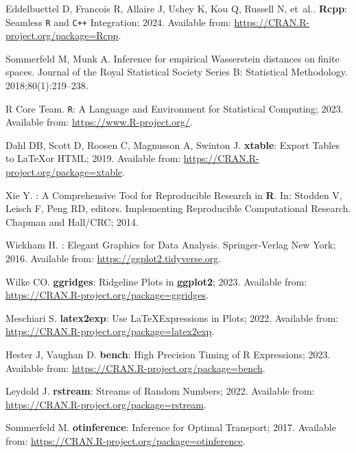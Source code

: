 \documentclass[10pt,letterpaper]{article}
\newcommand{\pkg}[1]{{\bf #1}}
\newcommand{\proglang}[1]{\texttt{#1}}
\begin{document}
\begin{thebibliography}{10}
Eddelbuettel D, Francois R, Allaire J, Ushey K, Kou Q, Russell N, et~al.. \pkg{Rcpp}: Seamless \proglang{R} and \proglang{C++} Integration; 2024.
\newblock Available from: \url{https://CRAN.R-project.org/package=Rcpp}.

Sommerfeld M, Munk A.
\newblock Inference for empirical Wasserstein distances on finite spaces.
\newblock Journal of the Royal Statistical Society Series B: Statistical Methodology. 2018;80(1):219--238.

{R Core Team}. \proglang{R}: {A} Language and Environment for Statistical Computing; 2023.
\newblock Available from: \url{https://www.R-project.org/}.

Dahl DB, Scott D, Roosen C, Magnusson A, Swinton J. \pkg{xtable}: {E}xport Tables to \LaTeX or HTML; 2019.
\newblock Available from: \url{https://CRAN.R-project.org/package=xtable}.

Xie Y.
\newblock \pkg{knitr}: {A} Comprehensive Tool for Reproducible Research in \pkg{R}.
\newblock In: Stodden V, Leisch F, Peng RD, editors. Implementing Reproducible Computational Research. Chapman and Hall/CRC; 2014.

Wickham H.
\newblock \pkg{ggplot2}: {E}legant Graphics for Data Analysis.
\newblock Springer-Verlag New York; 2016.
\newblock Available from: \url{https://ggplot2.tidyverse.org}.

Wilke CO. \pkg{ggridges}: {R}idgeline Plots in \pkg{ggplot2}; 2023.
\newblock Available from: \url{https://CRAN.R-project.org/package=ggridges}.

Meschiari S. \pkg{latex2exp}: {U}se \LaTeX Expressions in Plots; 2022.
\newblock Available from: \url{https://CRAN.R-project.org/package=latex2exp}.

Hester J, Vaughan D. \pkg{bench}: {H}igh Precision Timing of R Expressions; 2023.
\newblock Available from: \url{https://CRAN.R-project.org/package=bench}.

Leydold J. \pkg{rstream}: {S}treams of Random Numbers; 2022.
\newblock Available from: \url{https://CRAN.R-project.org/package=rstream}.

Sommerfeld M. \pkg{otinference}: {I}nference for Optimal Transport; 2017.
\newblock Available from: \url{https://CRAN.R-project.org/package=otinference}.

\end{thebibliography}
\end{document}
